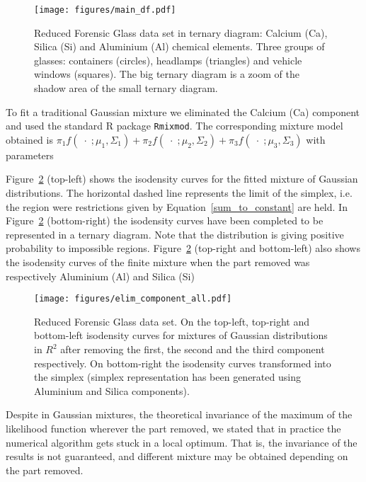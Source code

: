 \documentclass[12pt, a4paper]{article}
\begin{document}
\begin{figure}[htbp]
\centering
\texttt{[image: figures/main\_df.pdf]}%
\caption{Reduced Forensic Glass data set in ternary diagram: Calcium (Ca), Silica (Si) and Aluminium (Al) chemical elements. Three groups of glasses: containers (circles), headlamps (triangles) and vehicle windows (squares). The big ternary diagram is a zoom of the shadow area of the small ternary diagram.}
\label{fig04}
\end{figure}


To fit a traditional Gaussian mixture we eliminated the Calcium (Ca) component and used the standard R package \texttt{Rmixmod}. The corresponding mixture model obtained is
$
\pi_1 f(\;\cdot\; ; \mu_1, \Sigma_1) + \pi_2 f(\;\cdot\; ; \mu_2, \Sigma_2) + \pi_3 f(\;\cdot\; ; \mu_3, \Sigma_3)
$
with parameters

{\small  }


Figure~\ref{fig05component_elimination} (top-left) shows the isodensity curves for the fitted mixture of Gaussian distributions. The horizontal dashed line represents the limit of the simplex, i.e. the region were restrictions given by Equation~\ref{sum_to_constant} are held. In Figure~\ref{fig05component_elimination} (bottom-right) the isodensity curves have been completed to be represented in a ternary diagram. Note that the distribution is giving positive probability to impossible regions. Figure~\ref{fig05component_elimination} (top-right and bottom-left) also shows the isodensity curves of the finite mixture when the part removed was respectively Aluminium (Al) and Silica (Si)

\begin{figure}[htbp]
\texttt{[image: figures/elim\_component\_all.pdf]}
\caption{Reduced Forensic Glass data set. On the top-left, top-right and bottom-left isodensity curves for mixtures of Gaussian distributions in $R^{2}$ after removing the first, the second and the third component respectively. On bottom-right the isodensity curves transformed into the simplex (simplex representation has been generated using Aluminium and Silica components).}
\label{fig05component_elimination}
\end{figure}

Despite in Gaussian mixtures, the theoretical invariance of the maximum of the likelihood function wherever the part removed, we stated that in practice the numerical algorithm gets stuck in a local optimum. That is, the invariance of the results is not guaranteed, and different mixture may be obtained depending on the part removed. 
\end{document}
